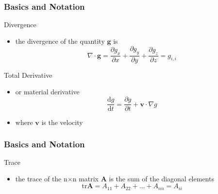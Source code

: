 \documentclass[hide notes,intlimits]{beamer}
\begin{document}
\begin{frame}
  \frametitle{Basics and Notation}
 \begin{block}{Divergence}
   \begin{itemize}
   \item the divergence of the quantity $\mathbf{g}$ is 
      \begin{equation*}
        \nabla \cdot \mathbf{g} = \frac{\partial g_{x}}{\partial x} + \frac{\partial g_{y}}{\partial y} + \frac{\partial g_{z}}{\partial z} = g_{i,i}
      \end{equation*}
    \end{itemize}
  \end{block}
 \begin{block}{Total Derivative}
   \begin{itemize}
   \item or \alert{material derivative} 
      \begin{equation*}
        \frac{\text{d} g}{\text{d} t} = \frac{\partial g}{\partial t} + \mathbf{v} \cdot \nabla g
     \end{equation*}
     \item where $\mathbf{v}$ is the velocity
    \end{itemize}
  \end{block}
\end{frame}
 
\begin{frame}
  \frametitle{Basics and Notation}
\begin{block}{Trace}
   \begin{itemize}
   \item the \alert{trace} of the n$\times$n matrix $\mathbf{A}$ is the sum of the diagonal elements
      \begin{equation*}
        \text{tr} \mathbf{A} = A_{11} + A_{22} + \ldots + A_{nn} = A_{ii}  
     \end{equation*}
    \end{itemize}
  \end{block}
\end{frame}
\end{document}
